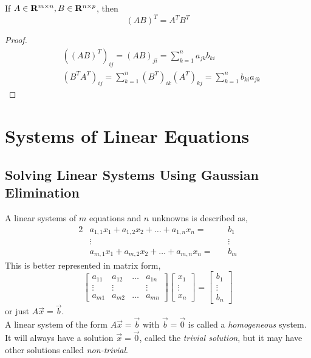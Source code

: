 \documentclass{article}
\begin{document}
	\begin{prop}
		If $ A \in \mathbf{R}^{m \times n}, B \in \mathbf{R}^{n \times p} $, then 
		\[
			(AB)^T = A^T B^T
		\]
	\end{prop}

	\begin{proof}
		\begin{align*}
			&((AB)^T)_{ij} = (AB)_{ji} = \sum\limits_{k=1}^{n} a_{jk} b_{ki} \\
			&(B^T A^T)_{ij} = \sum\limits_{k=1}^{n} (B^T)_{ik} (A^T)_{kj} = \sum\limits_{k=1}^{n} b_{ki} a_{jk}
		\end{align*}
	\end{proof}

	\section{Systems of Linear Equations}
	
	\subsection{Solving Linear Systems Using Gaussian Elimination}
	
	A linear systems of $ m $ equations and $ n $ unknowns is described as,
	\begin{alignat*}{2}
		&a_{1,1} x_1 + a_{1,2} x_2 + \dots + a_{1,n} x_n = &&b_1 \\
		&\vdots  &&\vdots \\
		&a_{m,1} x_1 + a_{m,2} x_2 + \dots + a_{m,n} x_n = \, &&b_m
	\end{alignat*}
	This is better represented in matrix form,
	\[
		\begin{bmatrix} a_{11} & a_{12} & \dots & a_{1n} \\ \vdots & \vdots & & \vdots \\ a_{m1} & a_{m2} & \dots & a_{mn} \end{bmatrix} \begin{bmatrix} x_1 \\ \vdots \\ x_n \end{bmatrix} = \begin{bmatrix} b_1 \\ \vdots \\ b_n \end{bmatrix}
	\]
	or just $ A\vec{x} = \vec{b} $. \\
	
	A linear system of the form $ A\vec{x} = \vec{b} $ with $ \vec{b} = \vec{0} $ is called a \textit{homogeneous} system. It will always have a solution $ \vec{x} = \vec{0} $, called the \textit{trivial solution}, but it may have other solutions called \textit{non-trivial}. \\
	
\end{document}
